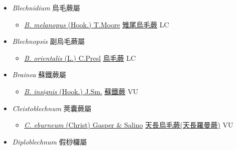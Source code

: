 
  \begin{itemize}
 \item[] \textit{Blechnidium} 烏毛蕨屬
                    
  \begin{itemize}
        \item[] \href{http://www.theplantlist.org/tpl1.1/search?q=Blechnidium+melanopus}{\textit{B. melanopus} (Hook.) T.Moore}     \href{\detokenize{http://taibnet.sinica.edu.tw/chi/taibnet_species_list.php?T2=雉尾烏毛蕨&T2_new_value=true&fr=y}}{雉尾烏毛蕨} LC
  \end{itemize}
 \item[] \textit{Blechnopsis} 副烏毛蕨屬
                    
  \begin{itemize}
        \item[] \href{http://www.theplantlist.org/tpl1.1/search?q=Blechnopsis+orientalis}{\textit{B. orientalis} (L.) C.Presl}     \href{\detokenize{http://taibnet.sinica.edu.tw/chi/taibnet_species_list.php?T2=烏毛蕨&T2_new_value=true&fr=y}}{烏毛蕨} LC
  \end{itemize}
 \item[] \textit{Brainea} 蘇鐵蕨屬
                    
  \begin{itemize}
        \item[] \href{http://www.theplantlist.org/tpl1.1/search?q=Brainea+insignis}{\textit{B. insignis} (Hook.) J.Sm.}   \href{\detokenize{http://taibnet.sinica.edu.tw/chi/taibnet_species_list.php?T2=蘇鐵蕨&T2_new_value=true&fr=y}}{蘇鐵蕨} VU
  \end{itemize}
 \item[] \textit{Cleistoblechnum} 莢囊蕨屬
                    
  \begin{itemize}
        \item[] \href{http://www.theplantlist.org/tpl1.1/search?q=Cleistoblechnum+eburneum}{\textit{C. eburneum} (Christ) Gasper \& Salino}     \href{\detokenize{http://taibnet.sinica.edu.tw/chi/taibnet_species_list.php?T2=天長烏毛蕨&T2_new_value=true&fr=y}}{天長烏毛蕨(天長羅曼蕨)}   VU
  \end{itemize}
 \item[] \textit{Diploblechnum} 假桫欏屬
                    

\end{itemize}
